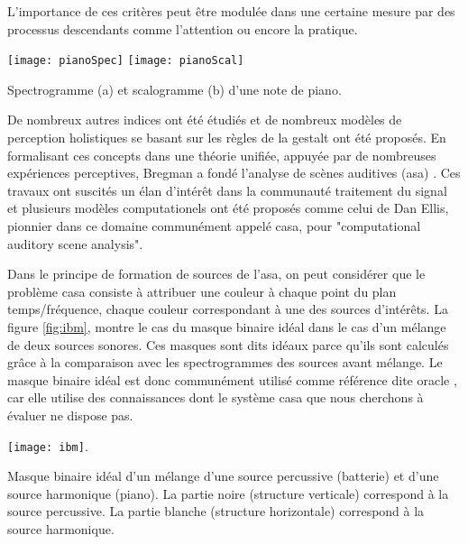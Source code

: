 L'importance de ces critères peut être modulée dans une certaine mesure par des processus descendants comme l'attention ou encore la pratique.

\begin{marginfigure}
  \texttt{[image: pianoSpec]}
  \texttt{[image: pianoScal]}
  \caption{Spectrogramme (a) et scalogramme (b) d'une note de piano.}
  \label{fig:piano}
\end{marginfigure}

De nombreux autres indices ont été étudiés et de nombreux modèles de perception holistiques se basant sur les règles de la gestalt ont été proposés. En formalisant ces concepts dans une théorie unifiée, appuyée par de nombreuses expériences perceptives, Bregman a fondé l'analyse de scènes auditives (asa) \cite{bregman1994auditory}. Ces travaux ont suscités un élan d'intérêt dans la communauté traitement du signal et plusieurs modèles computationels ont été proposés comme celui de Dan Ellis\cite{ellis}, pionnier dans ce domaine communément appelé casa, pour "computational auditory scene analysis".


Dans le principe de formation de sources de l'asa, on peut considérer que le problème casa consiste à attribuer une couleur à chaque point du plan temps/fréquence, chaque couleur correspondant à une des sources d'intérêts. La figure \ref{fig:ibm}, montre le cas du masque binaire idéal dans le cas d'un mélange de deux sources sonores. Ces masques sont dits idéaux parce qu'ils sont calculés grâce à la comparaison avec les spectrogrammes des sources avant mélange. Le masque binaire idéal est donc communément utilisé comme référence dite \og oracle \fg, car elle utilise des connaissances dont le système casa que nous cherchons à évaluer ne dispose pas.

\begin{marginfigure}
  \texttt{[image: ibm]}.
  \caption{Masque binaire idéal d'un mélange d'une source percussive (batterie) et d'une source harmonique (piano). La partie noire (structure verticale) correspond à la source percussive. La partie blanche (structure horizontale) correspond à la source harmonique.}
\end{marginfigure}

